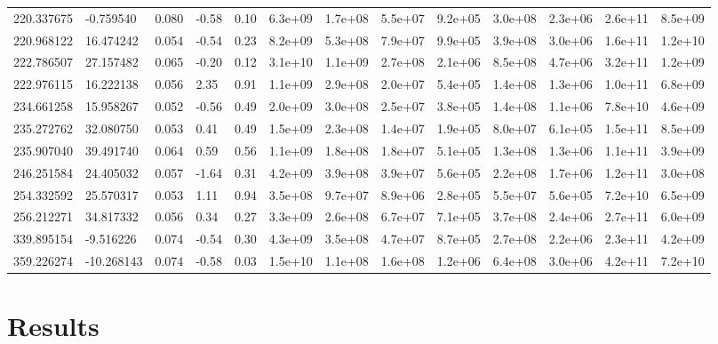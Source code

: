 \documentclass[referee]{aa}
\begin{document}
{\begin{landscape}
\begin{longtable}{lllllllllllll}
220.337675 & -0.759540 & 0.080 & -0.58 & 0.10 & 6.3e+09 & 1.7e+08 & 5.5e+07 & 9.2e+05 & 3.0e+08 & 2.3e+06 & 2.6e+11 & 8.5e+09 \\
220.968122 & 16.474242 & 0.054 & -0.54 & 0.23 & 8.2e+09 & 5.3e+08 & 7.9e+07 & 9.9e+05 & 3.9e+08 & 3.0e+06 & 1.6e+11 & 1.2e+10 \\
222.786507 & 27.157482 & 0.065 & -0.20 & 0.12 & 3.1e+10 & 1.1e+09 & 2.7e+08 & 2.1e+06 & 8.5e+08 & 4.7e+06 & 3.2e+11 & 1.2e+09 \\
222.976115 & 16.222138 & 0.056 & 2.35 & 0.91 & 1.1e+09 & 2.9e+08 & 2.0e+07 & 5.4e+05 & 1.4e+08 & 1.3e+06 & 1.0e+11 & 6.8e+09 \\
234.661258 & 15.958267 & 0.052 & -0.56 & 0.49 & 2.0e+09 & 3.0e+08 & 2.5e+07 & 3.8e+05 & 1.4e+08 & 1.1e+06 & 7.8e+10 & 4.6e+09 \\
235.272762 & 32.080750 & 0.053 & 0.41 & 0.49 & 1.5e+09 & 2.3e+08 & 1.4e+07 & 1.9e+05 & 8.0e+07 & 6.1e+05 & 1.5e+11 & 8.5e+09 \\
235.907040 & 39.491740 & 0.064 & 0.59 & 0.56 & 1.1e+09 & 1.8e+08 & 1.8e+07 & 5.1e+05 & 1.3e+08 & 1.3e+06 & 1.1e+11 & 3.9e+09 \\
246.251584 & 24.405032 & 0.057 & -1.64 & 0.31 & 4.2e+09 & 3.9e+08 & 3.9e+07 & 5.6e+05 & 2.2e+08 & 1.7e+06 & 1.2e+11 & 3.0e+08 \\
254.332592 & 25.570317 & 0.053 & 1.11 & 0.94 & 3.5e+08 & 9.7e+07 & 8.9e+06 & 2.8e+05 & 5.5e+07 & 5.6e+05 & 7.2e+10 & 6.5e+09 \\
256.212271 & 34.817332 & 0.056 & 0.34 & 0.27 & 3.3e+09 & 2.6e+08 & 6.7e+07 & 7.1e+05 & 3.7e+08 & 2.4e+06 & 2.7e+11 & 6.0e+09 \\
339.895154 & -9.516226 & 0.074 & -0.54 & 0.30 & 4.3e+09 & 3.5e+08 & 4.7e+07 & 8.7e+05 & 2.7e+08 & 2.2e+06 & 2.3e+11 & 4.2e+09 \\
359.226274 & -10.268143 & 0.074 & -0.58 & 0.03 & 1.5e+10 & 1.1e+08 & 1.6e+08 & 1.2e+06 & 6.4e+08 & 3.0e+06 & 4.2e+11 & 7.2e+10 \\
\hline
\end{longtable}
\end{landscape}
}

\section{Results}\label{sec:results}
\end{document}

